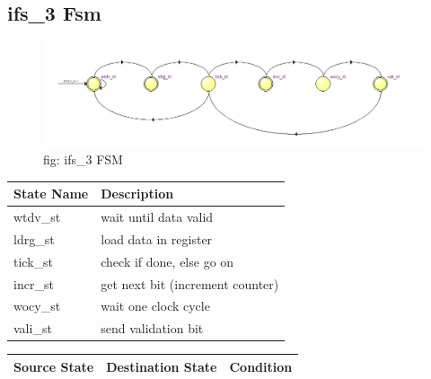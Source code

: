\documentclass[12pt,a4 paper] {report}
\begin{document}
\subsection{ifs\_3 Fsm}
\begin{figure}[h]
	\centering	
	\includegraphics[scale=0.4]{../png/ifs_3.png}
	\newline
	fig: ifs\_3 FSM\\
\end{figure}
\begin{center}
 \begin{tabular}{| p{4cm} | p{7cm} |}
	 \hline
	 State Name & Description \\
	 \hline
	 wtdv\_st & wait until data valid \\
	 \hline
	 ldrg\_st & load data in register \\
	 \hline
	 tick\_st & check if done, else go on \\
	 \hline
	 incr\_st & get next bit (increment counter) \\
	 \hline
	 wocy\_st & wait one clock cycle \\
	 \hline
	 vali\_st & send validation bit \\
	 \hline
 \end{tabular}
\end{center}
\begin{center}
	\begin{tabular}{| p{2cm} | p{2cm} | p{11cm} |}
		\hline
		Source State& Destination State & Condition \\
		\hline	
		
		
	\end{tabular}	
\end{center}
\end{document}
